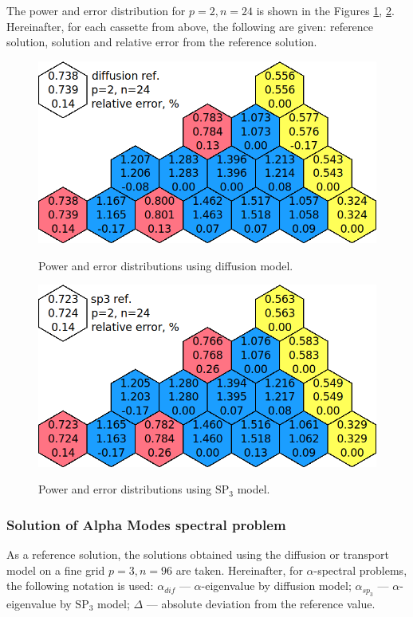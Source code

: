 \documentclass[authoryear]{elsarticle}
\begin{document}
The power and error distribution for $p = 2, n = 24$  is shown in the Figures \ref{fig:power_iaea_without_dif}, \ref{fig:power_ieae_without_sp3}.
Hereinafter, for each cassette from above, the following are given: reference solution, solution and relative error from the reference solution.

\begin{figure}[h]
\begin{center}
	\includegraphics[width=0.85\linewidth]{diff_without_p2n24.png}\\
	\caption{Power and error distributions using diffusion model.}
	\label{fig:power_iaea_without_dif}
\end{center}
\end{figure}

\begin{figure}[h]
\begin{center}
	\includegraphics[width=0.85\linewidth]{sp3_without_p2n24.png}\\
	\caption{Power and error distributions using $\mathrm{SP_3}$ model.}
	\label{fig:power_ieae_without_sp3}
\end{center}
\end{figure}

\subsubsection{Solution of Alpha Modes spectral problem}
As a reference solution, the solutions obtained using the diffusion or transport model on a fine grid $ p = 3, n = 96 $ are taken.
Hereinafter, for $\alpha$-spectral problems, the following notation is used: $\alpha_{dif}$ --- $\alpha$-eigenvalue by diffusion model; $\alpha_{sp_3}$ --- $\alpha$-eigenvalue by $\mathrm{SP_3}$ model; $\Delta$ --- absolute deviation from the reference value.
\end{document}
